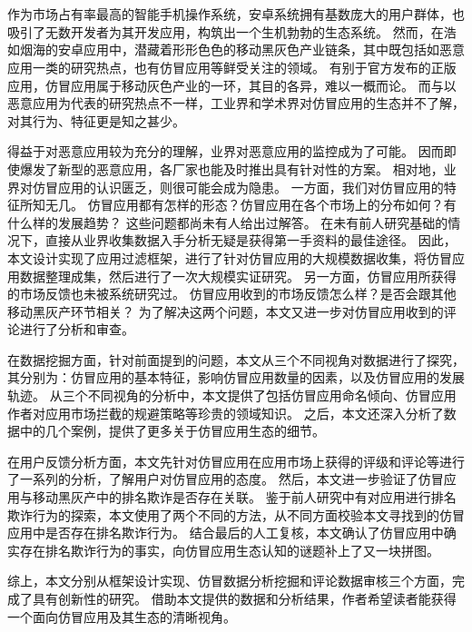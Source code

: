 
\chapter*{}
\vspace{-5mm}

\setlength{\baselineskip}{25pt} %

作为市场占有率最高的智能手机操作系统，安卓系统拥有基数庞大的用户群体，也吸引了无数开发者为其开发应用，构筑出一个生机勃勃的生态系统。
然而，在浩如烟海的安卓应用中，潜藏着形形色色的移动黑灰色产业链条，其中既包括如恶意应用一类的研究热点，也有仿冒应用等鲜受关注的领域。
有别于官方发布的正版应用，仿冒应用属于移动灰色产业的一环，其目的各异，难以一概而论。
而与以恶意应用为代表的研究热点不一样，工业界和学术界对仿冒应用的生态并不了解，对其行为、特征更是知之甚少。

得益于对恶意应用较为充分的理解，业界对恶意应用的监控成为了可能。
因而即使爆发了新型的恶意应用，各厂家也能及时推出具有针对性的方案。
相对地，业界对仿冒应用的认识匮乏，则很可能会成为隐患。
一方面，我们对仿冒应用的特征所知无几。
仿冒应用都有怎样的形态？仿冒应用在各个市场上的分布如何？有什么样的发展趋势？
这些问题都尚未有人给出过解答。
在未有前人研究基础的情况下，直接从业界收集数据入手分析无疑是获得第一手资料的最佳途径。
因此，本文设计实现了应用过滤框架\mytool ，进行了针对仿冒应用的大规模数据收集，将仿冒应用数据整理成集，然后进行了一次大规模实证研究。
另一方面，仿冒应用所获得的市场反馈也未被系统研究过。
仿冒应用收到的市场反馈怎么样？是否会跟其他移动黑灰产环节相关？
为了解决这两个问题，本文又进一步对仿冒应用收到的评论进行了分析和审查。

在数据挖掘方面，针对前面提到的问题，本文从三个不同视角对数据进行了探究，其分别为：仿冒应用的基本特征，影响仿冒应用数量的因素，以及仿冒应用的发展轨迹。
从三个不同视角的分析中，本文提供了包括仿冒应用命名倾向、仿冒应用作者对应用市场拦截的规避策略等珍贵的领域知识。
之后，本文还深入分析了数据中的几个案例，提供了更多关于仿冒应用生态的细节。

在用户反馈分析方面，本文先针对仿冒应用在应用市场上获得的评级和评论等进行了一系列的分析，了解用户对仿冒应用的态度。
然后，本文进一步验证了仿冒应用与移动黑灰产中的排名欺诈是否存在关联。
鉴于前人研究中有对应用进行排名欺诈行为的探索，本文使用了两个不同的方法，从不同方面校验本文寻找到的仿冒应用中是否存在排名欺诈行为。
结合最后的人工复核，本文确认了仿冒应用中确实存在排名欺诈行为的事实，向仿冒应用生态认知的谜题补上了又一块拼图。

综上，本文分别从框架设计实现、仿冒数据分析挖掘和评论数据审核三个方面，完成了具有创新性的研究。
借助本文提供的数据和分析结果，作者希望读者能获得一个面向仿冒应用及其生态的清晰视角。

 
